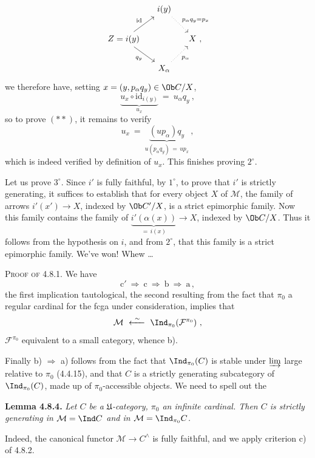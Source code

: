 
\[
\begin{tikzcd}[column sep=small]
 & i(y) \arrow[dr, dotted, "p_\alpha q_y=p_x"] & \\
Z=i(y) \arrow[ur, "\mathrm{id}"] \arrow[dr, "q_y"'] & & X \ , \\
 & X_\alpha \arrow[ur, dotted, "p_\alpha"'] &
\end{tikzcd}
\]
we therefore have, setting $x=(y,p_\alpha q_y)\in\Ob C/X$,
\[
\underbrace{u_x\circ\mathrm{id}_{i(y)}}_{u_x} \ = \ u_\alpha q_y \ ,
\]
so to prove $(**)$, it remains to verify
\[
u_x \ = \ \underbrace{(up_\alpha)q_y}_{u(p_\alpha q_y)\,=\,up_x} \ ,
\]
which is indeed verified by definition of $u_x$. This finishes proving $2^\circ$.

Let us prove $3^\circ$. Since $i'$ is fully faithful, by $1^\circ$, to prove that $i'$ is strictly generating, it suffices to establish that for every object $X$ of $\mathcal{M}$, the family of arrows $i'(x')\longrightarrow X$, indexed by $\Ob C'/X$, is a strict epimorphic family. Now this family contains the family of $\underbrace{i'(\alpha(x))}_{=\,i(x)}\longrightarrow X$, indexed by $\Ob C/X$. Thus it follows from the hypothesis on $i$, and from $2^\circ$, that this family is a strict epimorphic family. We've won! Whew \dots

\textsc{Proof of 4.8.1.} We have
\[
\mathrm{c}' \ \Longrightarrow \ \mathrm{c} \ \Longrightarrow \ \mathrm{b} \ \Longrightarrow \ \mathrm{a} \, ,
\]
the first implication tautological, the second resulting from the fact that $\pi_0$ a regular cardinal for the fcga under consideration, implies that
\[
\mathcal{M} \ \xleftarrow{\ \sim\ } \ \Ind_{\pi_0}(\mathcal{F}^{\pi_0}) \ ,
\]
$\mathcal{F}^{\pi_0}$ equivalent to a small category, whence b).

Finally b) $\Longrightarrow$ a) follows from the fact that $\Ind_{\pi_0}(C)$ is stable under $\varinjlim$ large relative to $\pi_0$ (4.4.15), and that $C$ is a strictly generating subcategory of $\Ind_{\pi_0}(C)$, made up of $\pi_0$-accessible objects. We need to spell out the

\textbf{Lemma 4.8.4.} \textit{Let $C$ be a $\mathfrak{U}$-category, $\pi_0$ an infinite cardinal. Then $C$ is strictly generating in $\mathcal{M}=\Ind C$ and in $\mathcal{M}=\Ind_{\pi_0}C$.}

Indeed, the canonical functor $\mathcal{M}\longrightarrow C^\wedge$ is fully faithful, and we apply criterion c) of 4.8.2.

